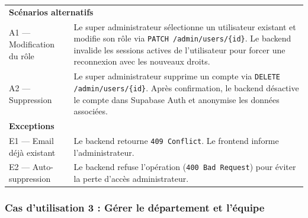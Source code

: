 \begin{longtable}{|p{4cm}|p{10cm}|}
{} \\ \hline
\multicolumn{2}{|l|}{\textbf{Scénarios alternatifs}} \\ \hline
A1 — Modification du rôle &
Le super administrateur sélectionne un utilisateur existant et modifie son rôle via \texttt{PATCH /admin/users/\{id\}}. Le backend invalide les sessions actives de l'utilisateur pour forcer une reconnexion avec les nouveaux droits. \\ \hline
A2 — Suppression &
Le super administrateur supprime un compte via \texttt{DELETE /admin/users/\{id\}}. Après confirmation, le backend désactive le compte dans Supabase Auth et anonymise les données associées. \\ \hline
\multicolumn{2}{|l|}{\textbf{Exceptions}} \\ \hline
E1 — Email déjà existant & Le backend retourne \texttt{409 Conflict}. Le frontend informe l'administrateur. \\ \hline
E2 — Auto-suppression & Le backend refuse l'opération (\texttt{400 Bad Request}) pour éviter la perte d'accès administrateur. \\ \hline
\end{longtable}
\renewcommand{\arraystretch}{1}

\subsubsection{Cas d'utilisation 3 : Gérer le département et l'équipe}

